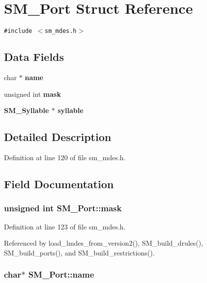 \section{SM\_\-Port Struct Reference}
\label{structSM__Port}
{\tt \#include $<$sm\_\-mdes.h$>$}

\subsection*{Data Fields}
\begin{CompactItemize}
\item 
char $\ast$ \bf{name}
\item 
unsigned int \bf{mask}
\item 
\bf{SM\_\-Syllable} $\ast$ \bf{syllable}
\end{CompactItemize}


\subsection{Detailed Description}




Definition at line 120 of file sm\_\-mdes.h.

\subsection{Field Documentation}
\subsubsection{\setlength{\rightskip}{0pt plus 5cm}unsigned int \bf{SM\_\-Port::mask}}\label{structSM__Port_359cc847fbfda3eef3b8e73d331441c9}




Definition at line 123 of file sm\_\-mdes.h.

Referenced by load\_\-lmdes\_\-from\_\-version2(), SM\_\-build\_\-drules(), SM\_\-build\_\-ports(), and SM\_\-build\_\-restrictions().
\subsubsection{\setlength{\rightskip}{0pt plus 5cm}char$\ast$ \bf{SM\_\-Port::name}}\label{structSM__Port_c30a0d9a4c1381707d7a81bffcc83957}




